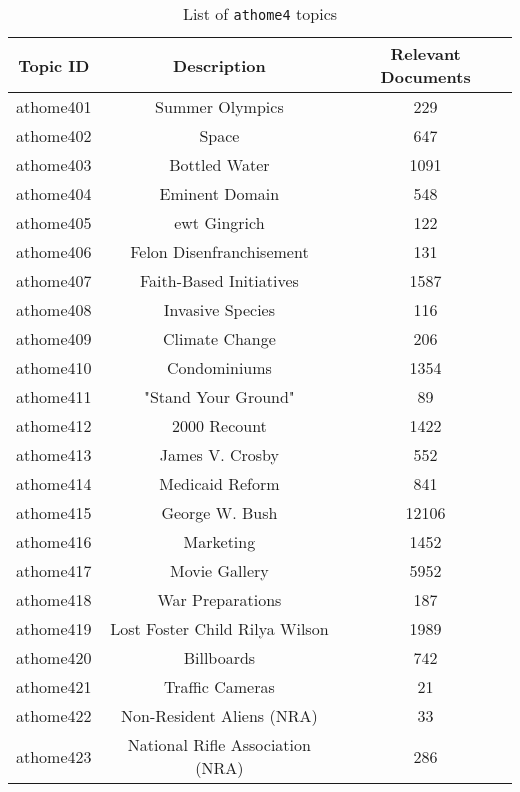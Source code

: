 \begin{table}[h]
\centering
\caption{List of \texttt{athome4} topics}
\label{tab:topics_athome4}
\begin{tabular}{|c|c|c|}
\hline
\textbf{Topic ID} & \textbf{Description} & \textbf{Relevant Documents} \\ \hline \hline
athome401 & Summer Olympics                   & 229 \\ \hline
athome402 & Space                             & 647 \\ \hline
athome403 & Bottled Water                     & 1091 \\ \hline
athome404 & Eminent Domain                    & 548 \\ \hline
athome405 & ewt Gingrich                      & 122 \\ \hline
athome406 & Felon Disenfranchisement          & 131 \\ \hline
athome407 & Faith-Based Initiatives           & 1587 \\ \hline
athome408 & Invasive Species                  & 116 \\ \hline
athome409 & Climate Change                    & 206 \\ \hline
athome410 & Condominiums                      & 1354 \\ \hline
athome411 & "Stand Your Ground"               & 89 \\ \hline
athome412 & 2000 Recount                      & 1422 \\ \hline
athome413 & James V. Crosby                   & 552 \\ \hline
athome414 & Medicaid Reform                   & 841 \\ \hline
athome415 & George W. Bush                    & 12106 \\ \hline
athome416 & Marketing                         & 1452 \\ \hline
athome417 & Movie Gallery                     & 5952 \\ \hline
athome418 & War Preparations                  & 187 \\ \hline
athome419 & Lost Foster Child Rilya Wilson    & 1989 \\ \hline
athome420 & Billboards                        & 742 \\ \hline
athome421 & Traffic Cameras                   & 21 \\ \hline
athome422 & Non-Resident Aliens (NRA)         & 33 \\ \hline
athome423 & National Rifle Association (NRA)  & 286 \\ \hline

\end{tabular}
\end{table}
